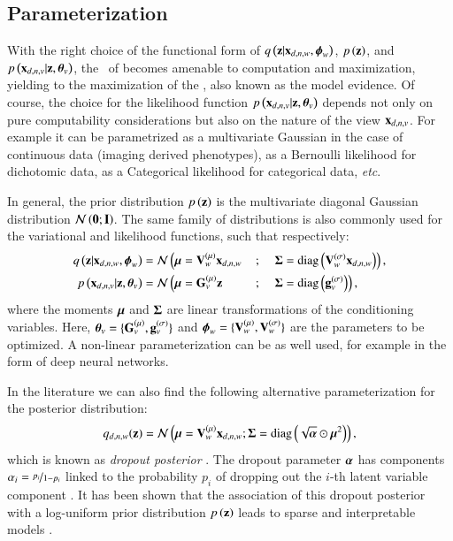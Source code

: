 

\subsection{Parameterization}

With the right choice of the functional form of $q\left(\mathbf{z}|\mathbf{x}_{d,n,w}, \boldsymbol{\phi}_w\right)$, $p\left(\mathbf{z}\right)$, and $p\left(\mathbf{x}_{d,n,v}|\mathbf{z}, \boldsymbol{\theta}_v\right)$, the \rhs\ of  becomes amenable to computation and maximization, yielding to the maximization of the \lhs, also known as the model evidence.
Of course, the choice for the likelihood function $p\left(\mathbf{x}_{d,n,v}|\mathbf{z}, \boldsymbol{\theta}_v\right)$ depends not only on pure computability considerations but also on the nature of the view $\mathbf{x}_{d,n,v}$.
For example it can be parametrized as a multivariate Gaussian in the case of continuous data (\ie imaging derived phenotypes), as a Bernoulli likelihood for dichotomic data, as a Categorical likelihood for categorical data, \textit{etc}.

In general, the prior distribution $p\left(\mathbf{z}\right)$ is the  multivariate diagonal Gaussian distribution $\mathcal{N}\left(\mathbf{0};\mathbf{I}\right)$.
The same family of distributions is also commonly used for the variational and likelihood functions, such that respectively:
\begin{alignat}{4}
\label{eq:encoder}
q\left(\mathbf{z}|\mathbf{x}_{d,n,w}, \boldsymbol{\phi}_w\right)  &= \mathcal{N} \left( \boldsymbol{\mu} = \mathbf{V}_w^{(\mu)} \mathbf{x}_{d,n,w} \right. &&{}; &&\left.\boldsymbol{\Sigma} = \operatorname{diag}\left(\mathbf{V}_w^{(\sigma)} \mathbf{x}_{d,n,w}\right) \right), \\
\label{eq:decoder}
p\left(\mathbf{x}_{d,n,v}|\mathbf{z},\boldsymbol{\theta}_v\right) &= \mathcal{N} \left( \boldsymbol{\mu} = \mathbf{G}_v^{(\mu)} \mathbf{z} \right. &&{} ; &&\left.\boldsymbol{\Sigma} = \operatorname{diag}\left(\mathbf{g}_v^{(\sigma)}\right) \right),
\end{alignat}
where the moments $\boldsymbol{\mu}$ and $\boldsymbol{\Sigma}$ are linear transformations of the conditioning variables.
Here, $\boldsymbol{\theta}_v = \{\mathbf{G}_v^{(\mu)}, \mathbf{g}_v^{(\sigma)}\}$ and $\boldsymbol{\phi}_w=\{\mathbf{V}_w^{(\mu)}, \mathbf{V}_w^{(\sigma)}\}$ are the parameters to be optimized.
A non-linear parameterization can be as well used, for example in the form of deep neural networks.

In the literature we can also find the following alternative parameterization for the posterior distribution:
\begin{equation}
\label{eq:dropout_posterior}
    q_{d,n,w}(\mathbf{z}) = \mathcal{N}\left(\boldsymbol{\mu} = \mathbf{V}_w^{(\mu)} \mathbf{x}_{d,n,w};\boldsymbol{\Sigma} = \operatorname{diag}\left(\sqrt{\boldsymbol{\alpha}} \odot \boldsymbol{\mu}^2\right)\right),
\end{equation}
which is known as \textit{dropout posterior} \citep{Kingma2015}.
The dropout parameter $\boldsymbol{\alpha}$ has components $\alpha_i = \nicefrac{p_i}{1-p_i}$ linked to the probability $p_i$ of dropping out the $i$-th latent variable component \citep{Wang2013}.
It has been shown that the association of this dropout posterior with a log-uniform prior distribution $p\left(\mathbf{z}\right)$ leads to sparse and interpretable models \citep{Antelmi2019,Molchanov2017}.

